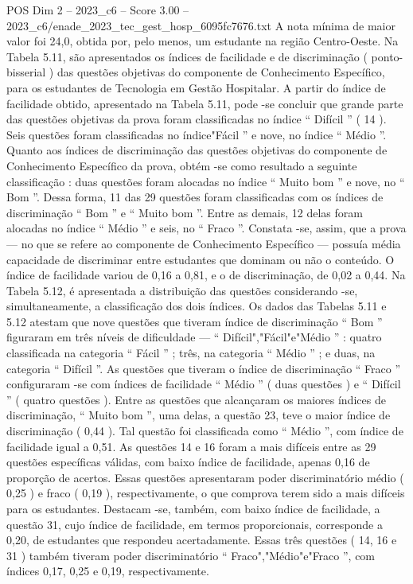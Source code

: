 \begin{textsample}{POS Dim 2 – 2023\_c6 – Score 3.00 – 2023\_c6/enade\_2023\_tec\_gest\_hosp\_6095fc7676.txt}
A nota mínima de maior valor foi 24,0, obtida por, pelo menos, um estudante na região Centro-Oeste.
Na Tabela 5.11, são apresentados os índices de facilidade e de discriminação ( ponto-bisserial ) das questões objetivas do componente de Conhecimento Específico, para os estudantes de Tecnologia em Gestão Hospitalar.
A partir do índice de facilidade obtido, apresentado na Tabela 5.11, pode -se concluir que grande parte das questões objetivas da prova foram classificadas no índice “ Difícil ” ( 14 ).
Seis questões foram classificadas no índice"Fácil ” e nove, no índice “ Médio ”.
Quanto aos índices de discriminação das questões objetivas do componente de Conhecimento Específico da prova, obtém -se como resultado a seguinte classificação : duas questões foram alocadas no índice “ Muito bom ” e nove, no “ Bom ”.
Dessa forma, 11 das 29 questões foram classificadas com os índices de discriminação “ Bom ” e “ Muito bom ”.
Entre as demais, 12 delas foram alocadas no índice “ Médio ” e seis, no “ Fraco ”.
Constata -se, assim, que a prova — no que se refere ao componente de Conhecimento Específico — possuía média capacidade de discriminar entre estudantes que dominam ou não o conteúdo.
O índice de facilidade variou de 0,16 a 0,81, e o de discriminação, de 0,02 a 0,44.
Na Tabela 5.12, é apresentada a distribuição das questões considerando -se, simultaneamente, a classificação dos dois índices.
Os dados das Tabelas 5.11 e 5.12 atestam que nove questões que tiveram índice de discriminação “ Bom ” figuraram em três níveis de dificuldade — “ Difícil","Fácil"e"Médio ” : quatro classificada na categoria “ Fácil ” ; três, na categoria “ Médio ” ; e duas, na categoria “ Difícil ”.
As questões que tiveram o índice de discriminação “ Fraco ” configuraram -se com índices de facilidade “ Médio ” ( duas questões ) e “ Difícil ” ( quatro questões ).
Entre as questões que alcançaram os maiores índices de discriminação, “ Muito bom ”, uma delas, a questão 23, teve o maior índice de discriminação ( 0,44 ).
Tal questão foi classificada como “ Médio ”, com índice de facilidade igual a 0,51.
As questões 14 e 16 foram a mais difíceis entre as 29 questões específicas válidas, com baixo índice de facilidade, apenas 0,16 de proporção de acertos.
Essas questões apresentaram poder discriminatório médio ( 0,25 ) e fraco ( 0,19 ), respectivamente, o que comprova terem sido a mais difíceis para os estudantes.
Destacam -se, também, com baixo índice de facilidade, a questão 31, cujo índice de facilidade, em termos proporcionais, corresponde a 0,20, de estudantes que respondeu acertadamente.
Essas três questões ( 14, 16 e 31 ) também tiveram poder discriminatório “ Fraco","Médio"e"Fraco ”, com índices 0,17, 0,25 e 0,19, respectivamente.

\end{textsample}
